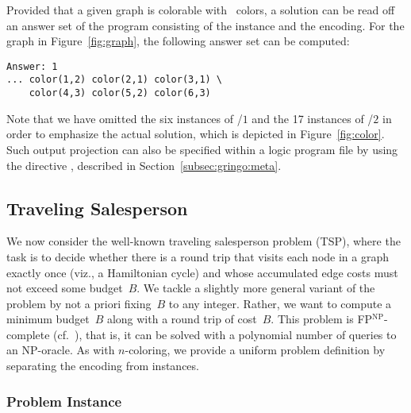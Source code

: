 Provided that a given graph is colorable with~ colors,
a solution can be read off an answer set of the program consisting
of the instance and the encoding.
For the graph in Figure~\ref{fig:graph},
the following answer set can be computed:%
%
\begin{lstlisting}[numbers=none]
Answer: 1
... color(1,2) color(2,1) color(3,1) \
    color(4,3) color(5,2) color(6,3)
\end{lstlisting}
%
Note that we have omitted the six instances of /$1$ and the
17 instances of \pred{edge}/$2$ in order to emphasize the actual solution,
which is depicted in Figure~\ref{fig:color}.
Such output projection can also be specified within a logic program file by
using the directive \code{\#show},
described in Section~\ref{subsec:gringo:meta}.

\subsection{Traveling Salesperson}\label{subsec:ex:tsp}

We now consider the well-known traveling salesperson problem (TSP),
where the task is to decide whether there is a round trip that visits
each node in a graph exactly once (viz., a Hamiltonian cycle) and whose
accumulated edge costs must not exceed some budget~$B$.
We tackle a slightly more general variant of the problem by not
a priori fixing~$B$ to any integer.
Rather,
we want to compute a minimum budget~$B$ along with a round trip of cost~$B$.
This problem is FP$^\textrm{NP}$-complete (cf.~\cite{papadimitriou94a}),
that is, it can be solved with a polynomial number of queries to an NP-oracle.
As with $n$-coloring,
we provide a uniform problem definition by separating the encoding from instances.

\subsubsection{Problem Instance}\label{subsec:tsp:instance}


